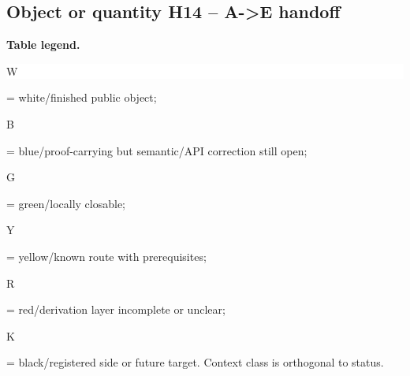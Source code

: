 \subsection*{Object or quantity H14 -- A->E handoff}
\hypertarget{objproof:H14}{}
\par\smallskip\noindent\begin{minipage}{0.99\linewidth}\footnotesize\raggedright\textbf{Table legend.} \colorbox{white}{\strut W} = white/finished public object; \colorbox{cyan!20}{\strut B} = blue/proof-carrying but semantic/API correction still open; \colorbox{green!18}{\strut G} = green/locally closable; \colorbox{yellow!25}{\strut Y} = yellow/known route with prerequisites; \colorbox{red!20}{\strut R} = red/derivation layer incomplete or unclear; \colorbox{black!18}{\strut K} = black/registered side or future target. Context class is orthogonal to status.\end{minipage}\par\vspace{0.25em}

